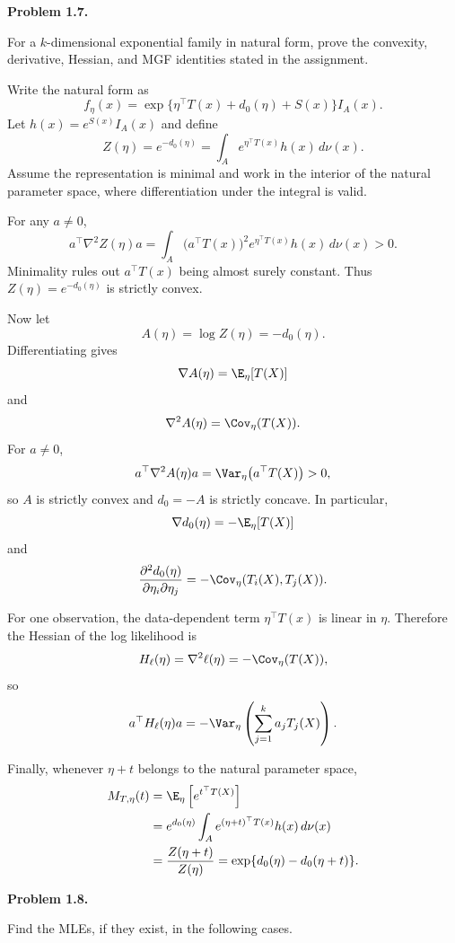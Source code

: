 \documentclass[answers,12pt,addpoints]{exam}
\begin{document}
\begin{questions}
\question[0] \textbf{Problem 1.7.}

For a $k$-dimensional exponential family in natural form, prove the convexity,
derivative, Hessian, and MGF identities stated in the assignment.

\begin{solution}
Write the natural form as
\[
f_\eta(x)
=
\exp\{\eta^\top T(x)+d_0(\eta)+S(x)\}I_A(x).
\]
Let $h(x)=e^{S(x)}I_A(x)$ and define
\[
Z(\eta)=e^{-d_0(\eta)}
=\int_A e^{\eta^\top T(x)}h(x)\,d\nu(x).
\]
Assume the representation is minimal and work in the interior of the natural
parameter space, where differentiation under the integral is valid.

For any $a\ne0$,
\[
a^\top\nabla^2Z(\eta)a
=\int_A\bigl(a^\top T(x)\bigr)^2
 e^{\eta^\top T(x)}h(x)\,d\nu(x)>0.
\]
Minimality rules out $a^\top T(x)$ being almost surely constant. Thus
$Z(\eta)=e^{-d_0(\eta)}$ is strictly convex.

Now let
\[
A(\eta)=\log Z(\eta)=-d_0(\eta).
\]
Differentiating gives
\[
\nabla A(\eta)=\E_\eta[T(X)]
\]
and
\[
\nabla^2A(\eta)=\Cov_\eta(T(X)).
\]
For $a\ne0$,
\[
a^\top\nabla^2A(\eta)a
=\Var_\eta\bigl(a^\top T(X)\bigr)>0,
\]
so $A$ is strictly convex and $d_0=-A$ is strictly concave. In particular,
\[
\nabla d_0(\eta)=-\E_\eta[T(X)]
\]
and
\[
\frac{\partial^2d_0(\eta)}{\partial\eta_i\partial\eta_j}
=-\Cov_\eta(T_i(X),T_j(X)).
\]

For one observation, the data-dependent term $\eta^\top T(x)$ is linear in $\eta$.
Therefore the Hessian of the log likelihood is
\[
H_\ell(\eta)=\nabla^2\ell(\eta)=-\Cov_\eta(T(X)),
\]
so
\[
a^\top H_\ell(\eta)a
=-\Var_\eta\left(\sum_{j=1}^ka_jT_j(X)\right).
\]

Finally, whenever $\eta+t$ belongs to the natural parameter space,
\begin{align*}
M_{T,\eta}(t)
&=\E_\eta\left[e^{t^\top T(X)}\right]\\
&=e^{d_0(\eta)}
\int_Ae^{(\eta+t)^\top T(x)}h(x)\,d\nu(x)\\
&=\frac{Z(\eta+t)}{Z(\eta)}
=\exp\{d_0(\eta)-d_0(\eta+t)\}.
\end{align*}
\end{solution}

\question[0] \textbf{Problem 1.8.}

Find the MLEs, if they exist, in the following cases.
\end{questions}
\end{document}
